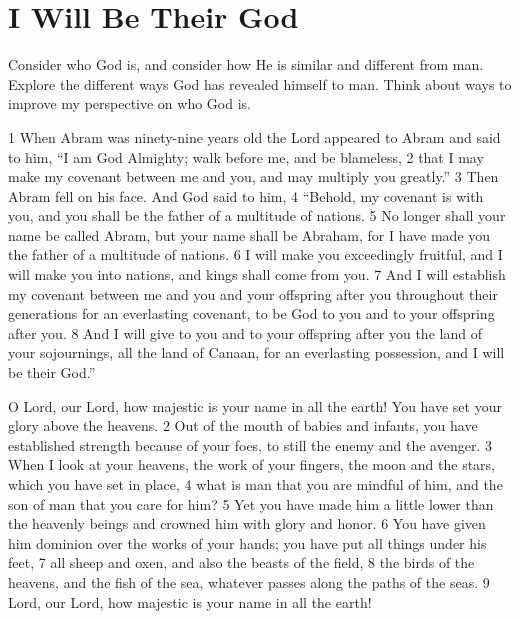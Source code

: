 \chapter{I Will Be Their God}

\begin{goals}
\goal Consider who God is, and consider how He is similar and different from man.
\goal Explore the different ways God has revealed himself to man.
\goal Think about ways to improve my perspective on who God is.
\end{goals}

\begin{bible}

1 When Abram was ninety-nine years old the Lord appeared to Abram and said to him, ``I am God Almighty; walk before me, and be blameless, 2 that I may make my covenant between me and you, and may multiply you greatly.'' 3 Then Abram fell on his face. And God said to him, 4 ``Behold, my covenant is with you, and you shall be the father of a multitude of nations. 5 No longer shall your name be called Abram, but your name shall be Abraham, for I have made you the father of a multitude of nations. 6 I will make you exceedingly fruitful, and I will make you into nations, and kings shall come from you. 7 And I will establish my covenant between me and you and your offspring after you throughout their generations for an everlasting covenant, to be God to you and to your offspring after you. 8 And I will give to you and to your offspring after you the land of your sojournings, all the land of Canaan, for an everlasting possession, and I will be their God.'' 

O Lord, our Lord, how majestic is your name in all the earth! You have set your glory above the heavens. 2 Out of the mouth of babies and infants, you have established strength because of your foes, to still the enemy and the avenger. 3 When I look at your heavens, the work of your fingers, the moon and the stars, which you have set in place, 4 what is man that you are mindful of him, and the son of man that you care for him? 5 Yet you have made him a little lower than the heavenly beings and crowned him with glory and honor. 6 You have given him dominion over the works of your hands; you have put all things under his feet, 7 all sheep and oxen, and also the beasts of the field, 8 the birds of the heavens, and the fish of the sea, whatever passes along the paths of the seas. 9 Lord, our Lord, how majestic is your name in all the earth!


\end{bible}
